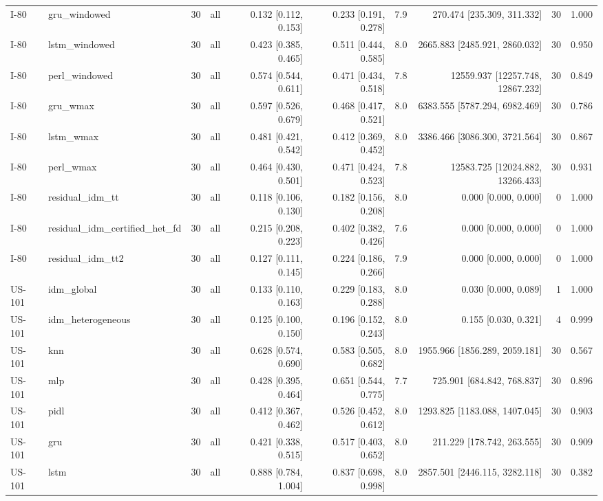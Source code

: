 \begin{table}[htbp]
{\begin{tabular}{llrlrrrrrr}
I-80 & gru\_windowed & 30 & all & 0.132 [0.112, 0.153] & 0.233 [0.191, 0.278] & 7.9 & 270.474 [235.309, 311.332] & 30 & 1.000 \\
I-80 & lstm\_windowed & 30 & all & 0.423 [0.385, 0.465] & 0.511 [0.444, 0.585] & 8.0 & 2665.883 [2485.921, 2860.032] & 30 & 0.950 \\
I-80 & perl\_windowed & 30 & all & 0.574 [0.544, 0.611] & 0.471 [0.434, 0.518] & 7.8 & 12559.937 [12257.748, 12867.232] & 30 & 0.849 \\
I-80 & gru\_wmax & 30 & all & 0.597 [0.526, 0.679] & 0.468 [0.417, 0.521] & 8.0 & 6383.555 [5787.294, 6982.469] & 30 & 0.786 \\
I-80 & lstm\_wmax & 30 & all & 0.481 [0.421, 0.542] & 0.412 [0.369, 0.452] & 8.0 & 3386.466 [3086.300, 3721.564] & 30 & 0.867 \\
I-80 & perl\_wmax & 30 & all & 0.464 [0.430, 0.501] & 0.471 [0.424, 0.523] & 7.8 & 12583.725 [12024.882, 13266.433] & 30 & 0.931 \\
I-80 & residual\_idm\_tt & 30 & all & 0.118 [0.106, 0.130] & 0.182 [0.156, 0.208] & 8.0 & 0.000 [0.000, 0.000] & 0 & 1.000 \\
I-80 & residual\_idm\_certified\_het\_fd & 30 & all & 0.215 [0.208, 0.223] & 0.402 [0.382, 0.426] & 7.6 & 0.000 [0.000, 0.000] & 0 & 1.000 \\
I-80 & residual\_idm\_tt2 & 30 & all & 0.127 [0.111, 0.145] & 0.224 [0.186, 0.266] & 7.9 & 0.000 [0.000, 0.000] & 0 & 1.000 \\
US-101 & idm\_global & 30 & all & 0.133 [0.110, 0.163] & 0.229 [0.183, 0.288] & 8.0 & 0.030 [0.000, 0.089] & 1 & 1.000 \\
US-101 & idm\_heterogeneous & 30 & all & 0.125 [0.100, 0.150] & 0.196 [0.152, 0.243] & 8.0 & 0.155 [0.030, 0.321] & 4 & 0.999 \\
US-101 & knn & 30 & all & 0.628 [0.574, 0.690] & 0.583 [0.505, 0.682] & 8.0 & 1955.966 [1856.289, 2059.181] & 30 & 0.567 \\
US-101 & mlp & 30 & all & 0.428 [0.395, 0.464] & 0.651 [0.544, 0.775] & 7.7 & 725.901 [684.842, 768.837] & 30 & 0.896 \\
US-101 & pidl & 30 & all & 0.412 [0.367, 0.462] & 0.526 [0.452, 0.612] & 8.0 & 1293.825 [1183.088, 1407.045] & 30 & 0.903 \\
US-101 & gru & 30 & all & 0.421 [0.338, 0.515] & 0.517 [0.403, 0.652] & 8.0 & 211.229 [178.742, 263.555] & 30 & 0.909 \\
US-101 & lstm & 30 & all & 0.888 [0.784, 1.004] & 0.837 [0.698, 0.998] & 8.0 & 2857.501 [2446.115, 3282.118] & 30 & 0.382 \\

\end{tabular}}
\end{table}
